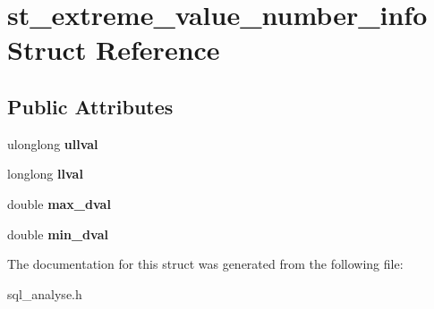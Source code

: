 \hypertarget{structst__extreme__value__number__info}{}\section{st\+\_\+extreme\+\_\+value\+\_\+number\+\_\+info Struct Reference}
\label{structst__extreme__value__number__info}
\subsection*{Public Attributes}
\begin{DoxyCompactItemize}
\item 
\mbox{\label{structst__extreme__value__number__info_ad7ac7fd7203147595fe52fce3e7d7b04}} 
ulonglong {\bfseries ullval}
\item 
\mbox{\label{structst__extreme__value__number__info_a26c072bbcc95fc2328a0bbd65ec25140}} 
longlong {\bfseries llval}
\item 
\mbox{\label{structst__extreme__value__number__info_adb564ae6194c5b460587680cdc2e9eee}} 
double {\bfseries max\+\_\+dval}
\item 
\mbox{\label{structst__extreme__value__number__info_a8bbeec1f4be0e22a7c8c7f96c6b16640}} 
double {\bfseries min\+\_\+dval}
\end{DoxyCompactItemize}


The documentation for this struct was generated from the following file\+:\begin{DoxyCompactItemize}
\item 
sql\+\_\+analyse.\+h\end{DoxyCompactItemize}
